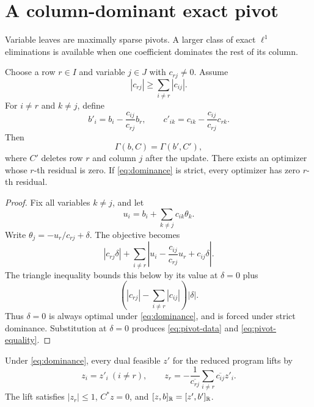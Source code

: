 \section{A column-dominant exact pivot}
\label{sec:dominance}

Variable leaves are maximally sparse pivots.  A larger class of exact
\(\ell^1\) eliminations is available when one coefficient dominates the
rest of its column.

\begin{theorem}\label{thm:pivot}
Choose a row \(r\in I\) and variable \(j\in J\) with \(c_{rj}\ne0\).
Assume
\begin{equation}\label{eq:dominance}
 |c_{rj}|\ge\sum_{i\ne r}|c_{ij}|.
\end{equation}
For \(i\ne r\) and \(k\ne j\), define
\begin{equation}\label{eq:pivot-data}
 b'_i=b_i-\frac{c_{ij}}{c_{rj}}b_r,
 \qquad
 c'_{ik}=c_{ik}-\frac{c_{ij}}{c_{rj}}c_{rk}.
\end{equation}
Then
\begin{equation}\label{eq:pivot-equality}
 \Gamma(b,C)=\Gamma(b',C'),
\end{equation}
where \(C'\) deletes row \(r\) and column \(j\) after the update.
There exists an optimizer whose \(r\)-th residual is zero.  If
\eqref{eq:dominance} is strict, every optimizer has zero \(r\)-th
residual.
\end{theorem}

\begin{proof}
Fix all variables \(k\ne j\), and let
\[
 u_i=b_i+\sum_{k\ne j}c_{ik}\theta_k.
\]
Write \(\theta_j=-u_r/c_{rj}+\delta\).  The objective becomes
\[
 |c_{rj}\delta|
 +\sum_{i\ne r}
 \left|u_i-\frac{c_{ij}}{c_{rj}}u_r+c_{ij}\delta\right|.
\]
The triangle inequality bounds this below by its value at \(\delta=0\)
plus
\[
 \left(|c_{rj}|-\sum_{i\ne r}|c_{ij}|\right)|\delta|.
\]
Thus \(\delta=0\) is always optimal under \eqref{eq:dominance}, and is
forced under strict dominance.  Substitution at \(\delta=0\) produces
\eqref{eq:pivot-data} and \eqref{eq:pivot-equality}.
\end{proof}

\begin{proposition}\label{prop:dual-lift}
Under \eqref{eq:dominance}, every dual feasible \(z'\) for the reduced
program lifts by
\begin{equation}\label{eq:dual-lift}
 z_i=z'_i\ (i\ne r),
 \qquad
 z_r=
 -\frac{1}{\overline{c_{rj}}}
 \sum_{i\ne r}\overline{c_{ij}}z'_i.
\end{equation}
The lift satisfies \(|z_r|\le1\), \(C^*z=0\), and
\([z,b]_{\mathbb R}=[z',b']_{\mathbb R}\).
\end{proposition}

